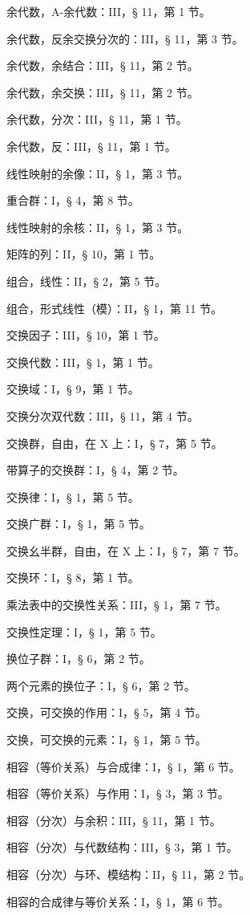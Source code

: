 余代数，A-余代数：III，§ 11，第 1 节。

余代数，反余交换分次的：III，§ 11，第 3 节。

余代数，余结合：III，§ 11，第 2 节。

余代数，余交换：III，§ 11，第 2 节。

余代数，分次：III，§ 11，第 1 节。

余代数，反：III，§ 11，第 1 节。

线性映射的余像：II，§ 1，第 3 节。

重合群：I，§ 4，第 8 节。

线性映射的余核：II，§ 1，第 3 节。

矩阵的列：II，§ 10，第 1 节。

组合，线性：II，§ 2，第 5 节。

组合，形式线性（模）：II，§ 1，第 11 节。

交换因子：III，§ 10，第 1 节。

交换代数：III，§ 1，第 1 节。

交换域：I，§ 9，第 1 节。

交换分次双代数：III，§ 11，第 4 节。

交换群，自由，在 X 上：I，§ 7，第 5 节。

带算子的交换群：I，§ 4，第 2 节。

交换律：I，§ 1，第 5 节。

交换广群：I，§ 1，第 5 节。

交换幺半群，自由，在 X 上：I，§ 7，第 7 节。

交换环：I，§ 8，第 1 节。

乘法表中的交换性关系：III，§ 1，第 7 节。

交换性定理：I，§ 1，第 5 节。

换位子群：I，§ 6，第 2 节。

两个元素的换位子：I，§ 6，第 2 节。

交换，可交换的作用：I，§ 5，第 4 节。

交换，可交换的元素：I，§ 1，第 5 节。

相容（等价关系）与合成律：I，§ 1，第 6 节。

相容（等价关系）与作用：I，§ 3，第 3 节。

相容（分次）与余积：III，§ 11，第 1 节。

相容（分次）与代数结构：III，§ 3，第 1 节。

相容（分次）与环、模结构：II，§ 11，第 2 节。

相容的合成律与等价关系：I，§ 1，第 6 节。

